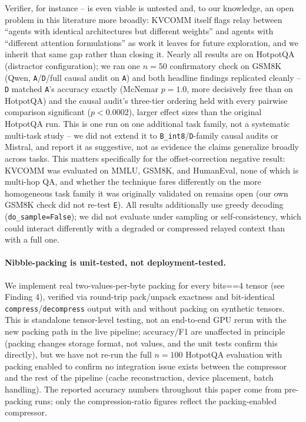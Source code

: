 \documentclass[11pt]{article}
\begin{document}
Verifier, for instance -- is even viable is untested and, to our
knowledge, an open problem in this literature more broadly: KVCOMM itself
flags relay between ``agents with identical architectures but different
weights'' and agents with ``different attention formulations'' as work it
leaves for future exploration, and we inherit that same gap rather than
closing it. Nearly all results are on HotpotQA
(distractor configuration); we ran one $n=50$ confirmatory check on GSM8K
(Qwen, \texttt{A}/\texttt{D}/full causal audit on \texttt{A}) and both
headline findings replicated cleanly -- \texttt{D} matched \texttt{A}'s
accuracy exactly (McNemar $p=1.0$, more decisively free than on
HotpotQA) and the causal audit's three-tier ordering held with every
pairwise comparison significant ($p<0.0002$), larger effect sizes than the
original HotpotQA run. This is one run on one additional task family, not
a systematic multi-task study -- we did not extend it to
\texttt{B\_int8}/\texttt{D}-family causal audits or Mistral, and report it
as suggestive, not as evidence the claims generalize broadly across
tasks. This matters specifically for the offset-correction negative
result: KVCOMM was evaluated on MMLU, GSM8K, and HumanEval, none of which
is multi-hop QA, and whether the technique fares differently on the more
homogeneous task family it was originally validated on remains open (our
own GSM8K check did not re-test \texttt{E}). All results additionally use
greedy decoding (\texttt{do\_sample=False}); we did not evaluate under
sampling or self-consistency, which could interact differently with a
degraded or compressed relayed context than with a full one.

\paragraph{Nibble-packing is unit-tested, not deployment-tested.} We
implement real two-values-per-byte packing for every bits==4 tensor (see
Finding 4), verified via round-trip pack/unpack exactness and
bit-identical \texttt{compress}/\texttt{decompress} output with and
without packing on synthetic tensors. This is standalone tensor-level
testing, not an end-to-end GPU rerun with the new packing path in the
live pipeline; accuracy/F1 are unaffected in principle (packing changes
storage format, not values, and the unit tests confirm this directly),
but we have not re-run the full $n=100$ HotpotQA evaluation with packing
enabled to confirm no integration issue exists between the compressor and
the rest of the pipeline (cache reconstruction, device placement, batch
handling). The reported accuracy numbers throughout this paper come from
pre-packing runs; only the compression-ratio figures reflect the
packing-enabled compressor.
\end{document}
